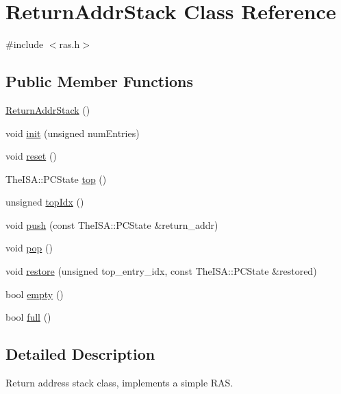 \hypertarget{classReturnAddrStack}{
\section{ReturnAddrStack Class Reference}
\label{classReturnAddrStack}
}


{\ttfamily \#include $<$ras.h$>$}

\subsection*{Public Member Functions}
\begin{DoxyCompactItemize}
\item 
\hyperlink{classReturnAddrStack_aadf0d7414f08594475bee33d04b5307e}{ReturnAddrStack} ()
\item 
void \hyperlink{classReturnAddrStack_af430eea67a799a5519573f02a630a2e9}{init} (unsigned numEntries)
\item 
void \hyperlink{classReturnAddrStack_ac805f9293f48e2007ac7e8f4733ac1af}{reset} ()
\item 
TheISA::PCState \hyperlink{classReturnAddrStack_a4fe6450bdc0ff84a60a9331dd88d8507}{top} ()
\item 
unsigned \hyperlink{classReturnAddrStack_a95a293e5b01511ae5363fa9cf69d47f0}{topIdx} ()
\item 
void \hyperlink{classReturnAddrStack_ac41dc83da8d0960b57df3e9a97c792c0}{push} (const TheISA::PCState \&return\_\-addr)
\item 
void \hyperlink{classReturnAddrStack_a9d2396f6b3f90a54b178db4efc002a78}{pop} ()
\item 
void \hyperlink{classReturnAddrStack_a2ceaaf5c1223ef4a262ccf835dee7b08}{restore} (unsigned top\_\-entry\_\-idx, const TheISA::PCState \&restored)
\item 
bool \hyperlink{classReturnAddrStack_a415c6d2ab459fa9b199c6e5689310b83}{empty} ()
\item 
bool \hyperlink{classReturnAddrStack_a0972abaf39558fe4dcb855c4c45ada60}{full} ()
\end{DoxyCompactItemize}


\subsection{Detailed Description}
Return address stack class, implements a simple RAS. 

